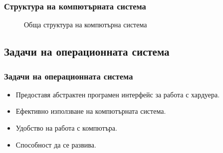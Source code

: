 \documentclass[ignorenonframetext, hyperref=unicode]{beamer}
\begin{document}
\begin{frame}
\frametitle{Структура на компютърната система}
\begin{figure}[h]
\center
{}
\caption{Обща структура на компютърна система}
\end{figure}
\end{frame}

\subsection{Задачи на операционната система}

\begin{frame}
\frametitle{Задачи на операционната система}
\begin{itemize}
  \item Предоставя абстрактен програмен интерфейс  за работа с хардуера.
  \item Ефективно използване на компютърната система.
  \item Удобство на работа с компютъра.
  \item Способност да се развива.
\end{itemize}

\end{frame}
\end{document}
